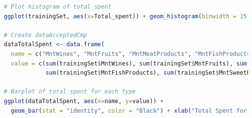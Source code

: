 \documentclass[letterpaper,11pt]{article}
\begin{document}
\begin{lstlisting}[language=R]
# Plot histogram of total_spent
ggplot(trainingSet, aes(x=Total_spent)) + geom_histogram(binwidth = 15, colour = "Black")

# Create dataAcceptedCmp
dataTotalSpent <- data.frame(
  name = c("MntWines", "MntFruits", "MntMeatProducts", "MntFishProducts", "MntSweetProducts", "MntGoldProds"),  
  value = c(sum(trainingSet$MntWines), sum(trainingSet$MntFruits), sum(trainingSet$MntMeatProducts),
            sum(trainingSet$MntFishProducts), sum(trainingSet$MntSweetProducts), sum(trainingSet$MntGoldProds)))

# Barplot of total_spent for each type
ggplot(dataTotalSpent, aes(x=name, y=value)) + 
  geom_bar(stat = "identity", color = "Black") + xlab("Total Spent for each type")  
\end{lstlisting}
\end{document}
